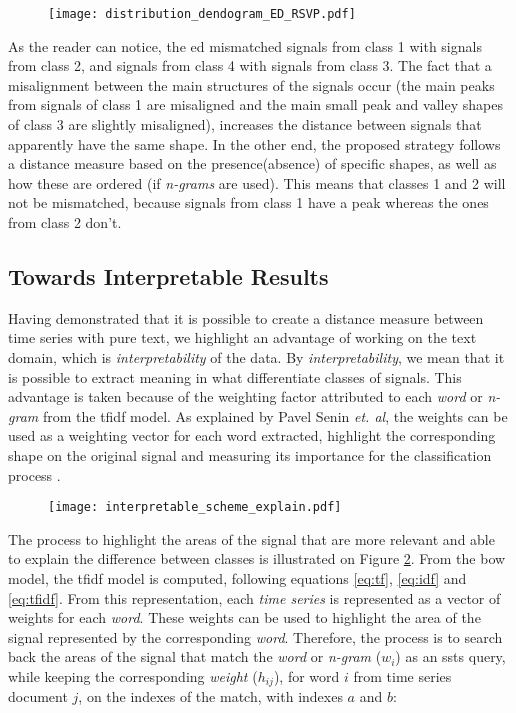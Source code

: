{\begin{figure}
    \centering
    \texttt{[image: distribution\_dendogram\_ED\_RSVP.pdf]}
    \caption{}
    \label{fig:distribution_dendogram}
\end{figure}
 
As the reader can notice, the \gls{ed} mismatched signals from class 1 with signals from class 2, and signals from class 4 with signals from class 3. The fact that a misalignment between the main structures of the signals occur (the main peaks from signals of class 1 are misaligned and the main small peak and valley shapes of class 3 are slightly misaligned), increases the distance between signals that apparently have the same shape. In the other end, the proposed strategy follows a distance measure based on the presence(absence) of specific shapes, as well as how these are ordered (if \textit{n-grams} are used). This means that classes 1 and 2 will not be mismatched, because signals from class 1 have a peak whereas the ones from class 2 don't.

\subsection{Towards Interpretable Results}

Having demonstrated that it is possible to create a distance measure between time series with pure text, we highlight an advantage of working on the text domain, which is \textit{interpretability} of the data. By \textit{interpretability}, we mean that it is possible to extract meaning in what differentiate classes of signals. This advantage is taken because of the weighting factor attributed to each \textit{word} or \textit{n-gram} from the \gls{tfidf} model. As explained by Pavel Senin \textit{et. al}, the weights can be used as a weighting vector for each word extracted, highlight the corresponding shape on the original signal and measuring its importance for the classification process \cite{sax_vsm}.

\begin{figure}
    \centering
    \texttt{[image: interpretable\_scheme\_explain.pdf]}
    \caption{}
    \label{fig:interpretable_step}
\end{figure}


The process to highlight the areas of the signal that are more relevant and able to explain the difference between classes is illustrated on Figure \ref{fig:interpretable_step}. From the \gls{bow} model, the \gls{tfidf} model is computed, following equations \ref{eq:tf}, \ref{eq:idf} and \ref{eq:tfidf}. From this representation, each \textit{time series} is represented as a vector of weights for each \textit{word}. These weights can be used to highlight the area of the signal represented by the corresponding \textit{word}. Therefore, the process is to search back the areas of the signal that match the \textit{word} or \textit{n-gram} ($w_i$) as an \gls{ssts} query, while keeping the corresponding \textit{weight} ($h_{ij}$), for word $i$ from time series document $j$, on the indexes of the match, with indexes $a$ and $b$:

}
